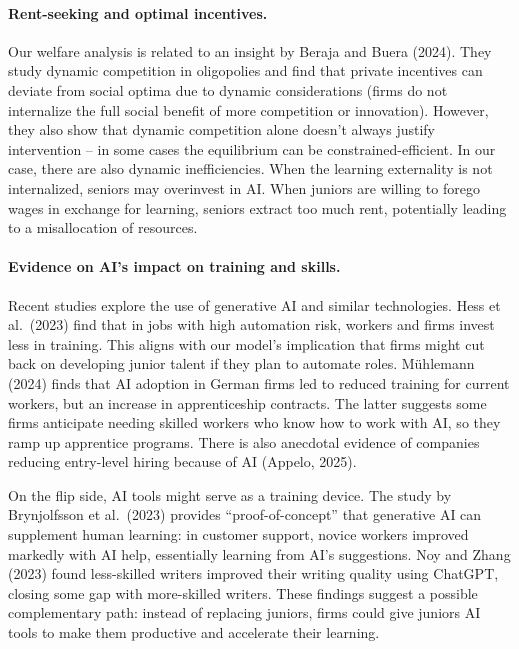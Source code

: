 \documentclass[12pt]{article}
\begin{document}
\paragraph{Rent-seeking and optimal incentives.} Our welfare analysis is related to an
insight by Beraja and Buera (2024). They study dynamic competition
in oligopolies and find that private incentives can deviate from
social optima due to dynamic considerations (firms do not internalize
the full social benefit of more competition or innovation). However,
they also show that {dynamic competition alone doesn't always
justify intervention} -- in some cases the equilibrium can be
constrained-efficient. In our case, there are also dynamic inefficiencies. When the learning externality is not internalized, seniors may overinvest in AI. When juniors are willing to forego wages in exchange for learning, seniors extract too much rent, potentially leading to a misallocation of resources. 

\paragraph{Evidence on AI's impact on training and skills.} Recent studies explore the use of generative AI and similar technologies.
Hess et al.~(2023) find that in jobs with high
automation risk, {workers and firms invest less in training}.
This aligns with our model's implication that firms might cut back
on developing junior talent if they plan to automate roles.
Mühlemann (2024) finds that {AI adoption in German firms led
to reduced training for current workers, but an increase in
apprenticeship contracts}. The latter suggests some firms anticipate
needing skilled workers who know how to work with AI, so they ramp
up apprentice programs. There is also anecdotal evidence of companies {reducing
entry-level hiring} because of AI (Appelo, 2025).

On the flip side, AI tools might serve as a {training device}.
The study by Brynjolfsson et al.~(2023) provides
{``proof-of-concept'' that generative AI can supplement human
learning}: in customer support, novice workers improved markedly
with AI help, essentially learning from AI's suggestions. Noy and
Zhang (2023) found less-skilled writers improved their writing
quality using ChatGPT, closing some gap with more-skilled writers.
These findings suggest a possible {complementary} path: instead
of replacing juniors, firms could give juniors AI tools to make them
productive and accelerate their learning. 
\end{document}
